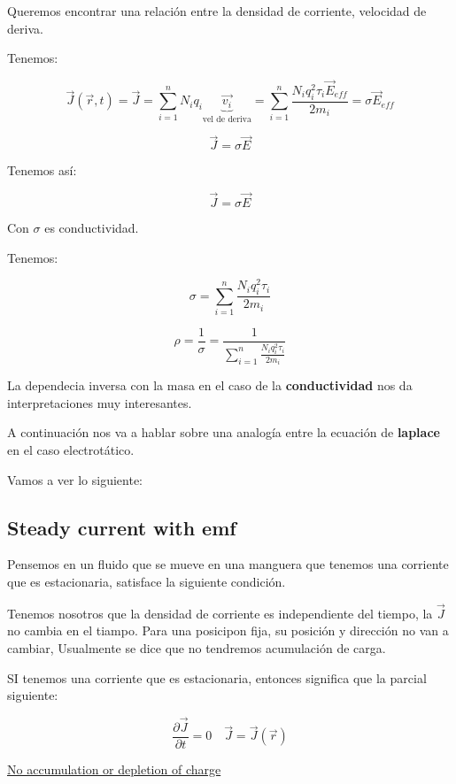 \documentclass{article}
\begin{document}
Queremos encontrar una relación entre la densidad de corriente, velocidad de deriva. 


Tenemos:


\[ \vec{J}(\vec{r},t)  = \vec{J} = \sum\limits_{i=1}^{n} N_{i}q_{i} \underbrace{\vec{v_{i}}}_{\text{vel de deriva}}  = \sum\limits_{i=1}^{n}  \frac{ N_{i} q^{2}_{i}\tau_{i} \vec{E}_{eff}}{2m_{i}} = \sigma\vec{E}_{eff}\]

\[ \vec{J} = \sigma\vec{E} \]



Tenemos así:


\[    \vec{J} = \sigma \vec{E}   \]

Con $\sigma$ es conductividad.


Tenemos:


\[  \boxed{  \sigma = \sum\limits_{i=1}^{n}  \frac{ N_{i}q_{i}^{2}\tau_{i}  }{2m_{i}}      } \]

\[ \rho =  \boxed{  \frac{ 1    }{ \sigma   }     } = \boxed{ \frac{ 1   }{   \sum\limits_{i=1}^{n}  \frac{ N_{i}q_{i}^{2}\tau_{i}  }{2m_{i}}  }  } \]

La dependecia inversa con la masa en el caso de la \textbf{conductividad} nos da interpretaciones muy interesantes. 


A continuación nos va a hablar sobre una analogía entre la ecuación de \textbf{laplace} en el caso electrotático.


Vamos a ver lo siguiente:


\subsection{Steady current with emf}


Pensemos en un fluido que se mueve en una manguera que tenemos una corriente que es estacionaria, satisface la siguiente condición.


Tenemos nosotros que la densidad de corriente es independiente del tiempo, la $\vec{J}$ no cambia en el tiampo. Para una posicipon fija, su posición y dirección no van a cambiar, Usualmente se dice que no tendremos acumulación de carga.


SI tenemos una corriente que es estacionaria, entonces significa que la parcial siguiente:


\[  \frac{  \partial \vec{J} }{\partial t}  = 0 \quad \vec{J} = \vec{J}(\vec{r})\]



\underline{No accumulation or depletion of charge}
\end{document}
